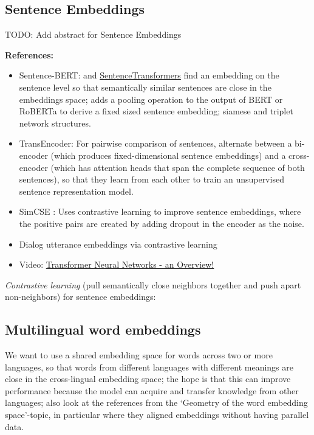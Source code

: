 \documentclass[11pt, a4paper]{amsart}
\begin{document}
\subsection{Sentence Embeddings}

TODO: Add abstract for Sentence Embeddings


\noindent \textbf{References:}
\begin{itemize}
	\item Sentence-BERT: \cite{DBLP:journals/corr/abs-1908-10084} and \href{https://www.sbert.net/}{SentenceTransformers}
	find an embedding on the sentence level so that semantically similar sentences are close in the embeddings space;
	adds a pooling operation to the output of BERT or RoBERTa to derive a fixed sized sentence embedding;
	siamese and triplet network structures.
	\item TransEncoder: For pairwise comparison of sentences, \cite{DBLP:journals/corr/abs-2109-13059} alternate between a bi-encoder (which produces fixed-dimensional sentence embeddings) and a cross-encoder (which has attention heads that span the complete sequence of both sentences), so that they learn from each other to train an unsupervised sentence representation model.
	\item SimCSE \cite{DBLP:journals/corr/abs-2104-08821}: Uses contrastive learning to improve sentence embeddings, where the positive pairs are created by adding dropout in the encoder as the noise.
	\item Dialog utterance embeddings via contrastive learning \cite{https://doi.org/10.48550/arxiv.2205.13568}
	\item Video: \href{https://youtu.be/O3xbVmpdJwU}{Transformer Neural Networks - an Overview!}
\end{itemize}

{
	\color{blue}
	
	\emph{Contrastive learning} (pull semantically close neighbors together and push apart non-neighbors) for sentence embeddings:
} %


\subsection{Multilingual word embeddings}

We want to use a shared embedding space for words across two or more languages, so that words from different languages with different meanings are close in the cross-lingual embedding space;
the hope is that this can improve performance because the model can acquire and transfer knowledge from other languages;
also look at the references from the `Geometry of the word embedding space'-topic, in particular \cite{DBLP:journals/corr/abs-1710-04087} where they aligned embeddings without having parallel data.
\end{document}
